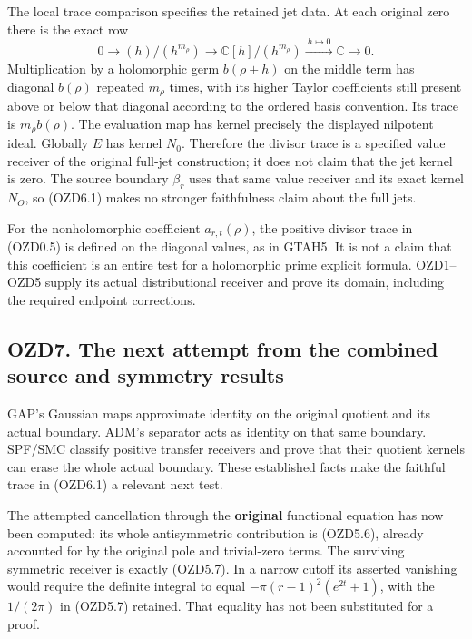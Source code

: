 The local trace comparison specifies the retained jet data. At each
original zero there is the exact row \[
0\longrightarrow(h)/(h^{m_\rho})\longrightarrow
\mathbb C[h]/(h^{m_\rho})\xrightarrow{\ h\mapsto0\ }\mathbb C\longrightarrow0.
\tag{OZD6.2}
\] Multiplication by a holomorphic germ \(b(\rho+h)\) on the middle term
has diagonal \(b(\rho)\) repeated \(m_\rho\) times, with its higher
Taylor coefficients still present above or below that diagonal according
to the ordered basis convention. Its trace is \(m_\rho b(\rho)\). The
evaluation map has kernel precisely the displayed nilpotent ideal.
Globally \(E\) has kernel \(N_0\). Therefore the divisor trace is a
specified value receiver of the original full-jet construction; it does
not claim that the jet kernel is zero. The source boundary \(\beta_r\)
uses that same value receiver and its exact kernel \(N_O\), so (OZD6.1)
makes no stronger faithfulness claim about the full jets.

For the nonholomorphic coefficient \(a_{r,t}(\rho)\), the positive
divisor trace in (OZD0.5) is defined on the diagonal values, as in
GTAH5. It is not a claim that this coefficient is an entire test for a
holomorphic prime explicit formula. OZD1--OZD5 supply its actual
distributional receiver and prove its domain, including the required
endpoint corrections.

\subsection{OZD7. The next attempt from the combined source and symmetry
results}\label{ozd7.-the-next-attempt-from-the-combined-source-and-symmetry-results}

GAP's Gaussian maps approximate identity on the original quotient and
its actual boundary. ADM's separator acts as identity on that same
boundary. SPF/SMC classify positive transfer receivers and prove that
their quotient kernels can erase the whole actual boundary. These
established facts make the faithful trace in (OZD6.1) a relevant next
test.

The attempted cancellation through the \textbf{original} functional
equation has now been computed: its whole antisymmetric contribution is
(OZD5.6), already accounted for by the original pole and trivial-zero
terms. The surviving symmetric receiver is exactly (OZD5.7). In a narrow
cutoff its asserted vanishing would require the definite integral to
equal \(-\pi(r-1)^2(e^{2t}+1)\), with the \(1/(2\pi)\) in (OZD5.7)
retained. That equality has not been substituted for a proof.

